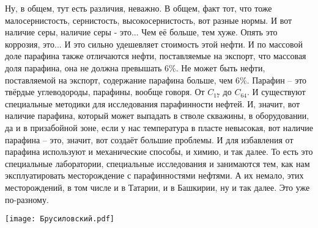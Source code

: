 \documentclass[main.tex]{subfiles}
\begin{document}
Ну, в общем, тут есть различия, неважно.
В общем, факт тот, что тоже малосернистость, сернистость, высокосернистость, вот разные нормы.
И вот наличие серы, наличие серы - это...
Чем её больше, тем хуже.
Опять это коррозия, это...
И это сильно удешевляет стоимость этой нефти.
И по массовой доле парафина также отличаются нефти, поставляемые на экспорт, что массовая доля парафина, она не должна превышать 6\%.
Не может быть нефти, поставляемой на экспорт, содержание парафина больше, чем 6\%.
Парафин -- это твёрдые углеводороды, парафины, вообще говоря.
От $C_{17}$ до $C_{64}$.
И существуют специальные методики для исследования парафинности нефтей.
И, значит, вот наличие парафина, который может выпадать в стволе скважины, в оборудовании, да и в призабойной зоне, если у нас температура в пласте невысокая, вот наличие парафина -- это, значит, вот создаёт большие проблемы.
И для избавления от парафина используют и механические способы, и химию, и так далее.
То есть это специальные лаборатории, специальные исследования и занимаются тем, как нам эксплуатировать месторождение с парафинностями нефтями.
А их немало, этих месторождений, в том числе и в Татарии, и в Башкирии, ну и так далее.
Это уже по-разному.

\begin{center}
\texttt{[image: Брусиловский.pdf]}
\end{center}
\end{document}
